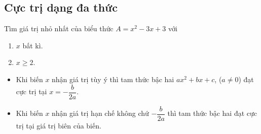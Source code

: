 \subsection{Cực trị dạng đa thức}
\begin{vd}
Tìm giá trị nhỏ nhất của biểu thức $A=x^2-3x+3$ với 
\begin{multicols}{2}
	\begin{enumerate}
		\item $x$ bất kì.
		\item $x\geq2$.
	\end{enumerate}
\end{multicols}
\end{vd}
\begin{note}
\begin{itemize}
	\item Khi biến $x$ nhận giá trị tùy ý thì tam thức bậc hai $ax^2+bx+c$, ($a\ne0$) đạt cực trị tại $x=-\dfrac{b}{2a}$.
	\item Khi biến $x$ nhận giá trị hạn chế không chứ $-\dfrac{b}{2a}$ thì tam thức bậc hai đạt cực trị tại giá trị biên của biến.
\end{itemize}
\end{note}
